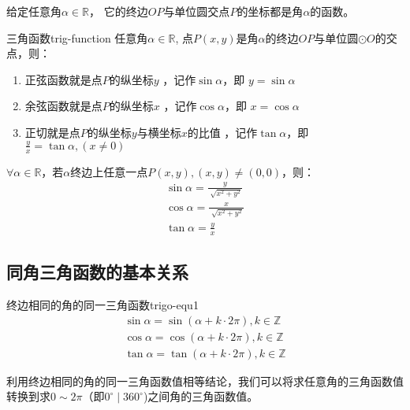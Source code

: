 给定任意角$\alpha \in \mathbb{R}$， 它的终边$OP$与单位圆交点$P$的坐标都是角$\alpha$的函数。

\begin{definition}{三角函数}{trig-function}
任意角$\alpha \in \mathbb{R}$, 点$P(x,y)$是角$\alpha$的终边$OP$与单位圆$\odot O$的交点，则：
\begin{enumerate}
\item 正弦函数就是点$P$的纵坐标$y$ ，记作$\sin{\alpha}$，即 $y=\sin{\alpha}$
\item 余弦函数就是点$P$的纵坐标$x$ ，记作$\cos{\alpha}$，即 $x=\cos{\alpha}$
\item 正切就是点$P$的纵坐标$y$与横坐标$x$的比值 ，记作$\tan{\alpha}$，即 $\displaystyle \frac{y}{x}=\tan{\alpha}, (x \neq 0)$
\end{enumerate}
\end{definition}

\begin{conclusion}
$\forall \alpha \in \mathbb{R}$，若$\alpha$终边上任意一点$P(x,y), (x, y) \neq (0, 0)$，则：
\begin{equation}
\begin{array}{l}
\displaystyle \sin{\alpha} = \frac{y}{\sqrt[]{x^2+y^2}} \\
\displaystyle \cos{\alpha} = \frac{x}{\sqrt[]{x^2+y^2}} \\
\displaystyle \tan{\alpha} = \frac{y}{x}
\end{array}
\end{equation}
\end{conclusion}
\subsection{同角三角函数的基本关系}

\begin{definition}{终边相同的角的同一三角函数}{trigo-equ1}
	\begin{equation}
	\begin{array}{l}
		\sin{\alpha} = \sin{\left(\alpha + k \cdot 2 \pi \right)}, k \in \mathbb{Z} \\
		\cos{\alpha} = \cos{\left(\alpha + k \cdot 2 \pi \right)}, k \in \mathbb{Z} \\
		\tan{\alpha} = \tan{\left(\alpha + k \cdot 2 \pi \right)}, k \in \mathbb{Z}	
	\end{array}
	\end{equation}
\end{definition}

利用\textcolor{third}{终边相同的角的同一三角函数值相等}结论，我们可以将求任意角的三角函数值转换到求$\displaystyle 0 \sim 2\pi$（即$0^{\circ} \mid 360^{\circ}$)之间角的三角函数值。

